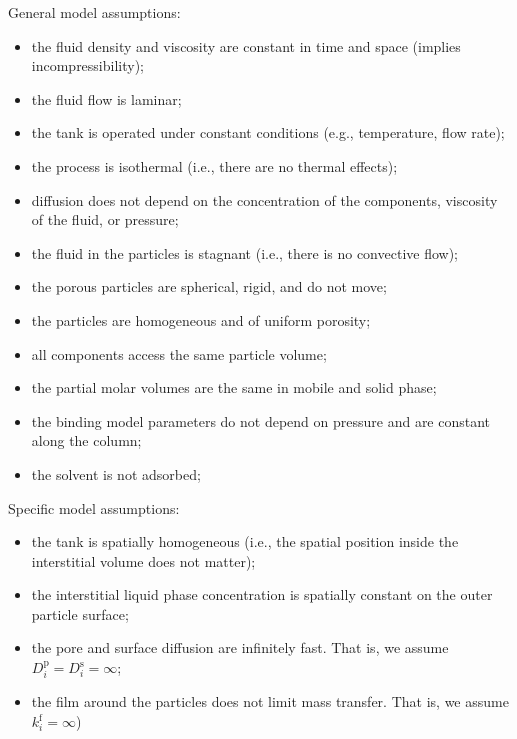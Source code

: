 \documentclass{article}
\begin{document}
General model assumptions:
\begin{itemize}
    \item the fluid density and viscosity are constant in time and space (implies incompressibility);
    \item the fluid flow is laminar;
    \item the tank is operated under constant conditions (e.g., temperature, flow rate);
    \item the process is isothermal (i.e., there are no thermal effects);
    \item diffusion does not depend on the concentration of the components, viscosity of the fluid, or pressure;
    \item the fluid in the particles is stagnant (i.e., there is no convective flow);
    \item the porous particles are spherical, rigid, and do not move;
    \item the particles are homogeneous and of uniform porosity;
    \item all components access the same particle volume;
    \item the partial molar volumes are the same in mobile and solid phase;
    \item the binding model parameters do not depend on pressure and are constant along the column;
    \item the solvent is not adsorbed;
\end{itemize}

Specific model assumptions:
\begin{itemize}
    \item the tank is spatially homogeneous (i.e., the spatial position inside the interstitial volume does not matter);
    \item the interstitial liquid phase concentration is spatially constant on the outer particle surface;
    \item the pore and surface diffusion are infinitely fast. That is, we assume $D^{\mathrm{p}}_{i} = D^{\mathrm{s}}_{i} = \infty$;
    \item the film around the particles does not limit mass transfer. That is, we assume $k^{\mathrm{f}}_{i} = \infty$)
\end{itemize}
\end{document}
